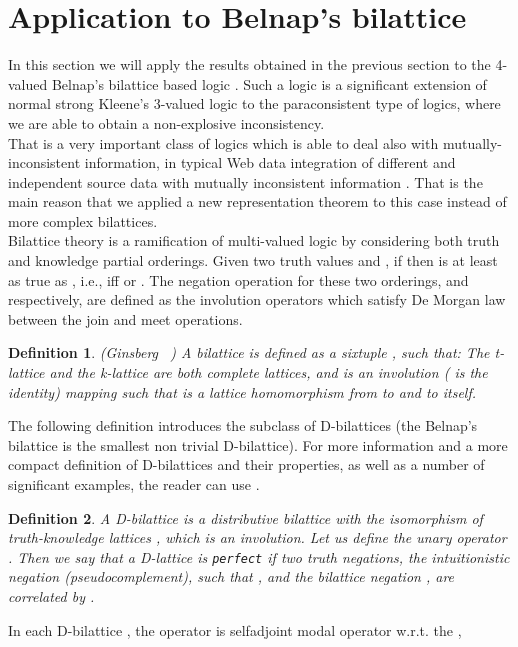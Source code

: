 \documentclass[10pt,twocolumn]{article}
\newtheorem{definition}{Definition}
\begin{document}
\section{Application to Belnap's bilattice}
In this section we will apply the results obtained in the previous section to the 4-valued Belnap's bilattice
 based logic . Such a logic is a significant extension of normal strong Kleene's
 3-valued logic to the paraconsistent type of logics, where we are
 able to obtain a non-explosive inconsistency.\\ That is a very important
 class of logics which is able to deal also with
 mutually-inconsistent information, in typical Web data integration
 of different and independent source data with mutually inconsistent
 information \cite{MajkA04}. That is the main reason that we applied a new representation theorem to this case instead
 of more complex bilattices.\\
 Bilattice theory is a ramification of multi-valued logic by
considering both truth  and knowledge   partial
orderings. Given two truth values  and , if  then
 is at least as true as , i.e.,  iff  or
. The negation operation for these two orderings,  and
 respectively, are defined as the involution operators which
satisfy De Morgan law between the join and meet operations.
\begin{definition} (Ginsberg ~\cite{Gins88})  \label{def:billat} A bilattice  is
defined as a sixtuple ,
such that:  The t-lattice  and the
k-lattice  are both complete lattices,
and   is an involution ( is the
identity) mapping such that  is a lattice homomorphism from
 to  and  to itself.
\end{definition}
 The following definition introduces the subclass of D-bilattices \cite{Majk06Bi}
 (the Belnap's bilattice is the smallest non trivial D-bilattice). For
 more information and a more compact definition of D-bilattices and their properties,
 as well as a number of significant examples, the reader can use \cite{Majk07MV}.
\begin{definition}  \cite{Majk07MV} \label{def:d-billat}
A D-bilattice  is a  distributive bilattice  with the isomorphism of truth-knowledge
lattices , which is an
involution. Let us define the unary operator . Then we say
that a D-lattice  is \verb"perfect" if two truth negations, the
intuitionistic negation  (pseudocomplement), such that
, and the bilattice
negation , are correlated by .
\end{definition}
In each  D-bilattice ,
the  operator  is selfadjoint modal operator w.r.t. the ,
\end{document}
